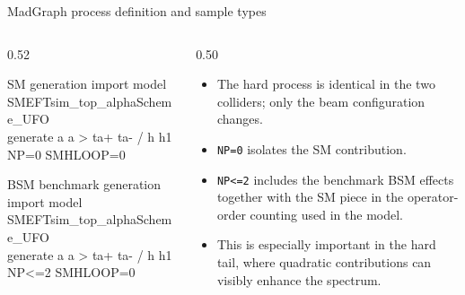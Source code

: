 \documentclass[aspectratio=1610,english]{beamer}
\begin{document}
\begin{frame}[fragile]{MadGraph process definition and sample types}
\begin{columns}[T]
\begin{column}{0.52\textwidth}
\begin{block}{SM generation}
\scriptsize\ttfamily
import model SMEFTsim\_top\_alphaScheme\_UFO\\
\vspace{0.4ex}
generate a a > ta+ ta- / h h1 NP=0 SMHLOOP=0
\end{block}
\begin{block}{BSM benchmark generation}
\scriptsize\ttfamily
import model SMEFTsim\_top\_alphaScheme\_UFO\\
\vspace{0.4ex}
generate a a > ta+ ta- / h h1 NP<=2 SMHLOOP=0
\end{block}
\end{column}
\begin{column}{0.50\textwidth}
\begin{itemize}
\justifying
\item The hard process is identical in the two colliders; only the beam configuration changes.
\item \texttt{NP=0} isolates the SM contribution.
\item \texttt{NP<=2} includes the benchmark BSM effects together with the SM piece in the operator-order counting used in the model.
\item This is especially important in the hard tail, where quadratic contributions can visibly enhance the spectrum.
\end{itemize}
\end{column}
\end{columns}
\end{frame}
\end{document}
